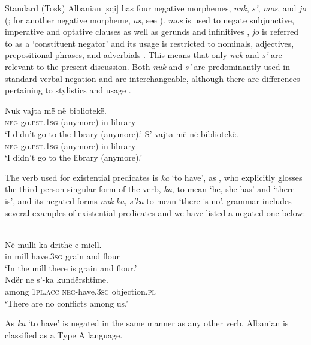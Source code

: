 ﻿\documentclass[output=paper]{langsci/langscibook}
\begin{document}
Standard (Tosk) Albanian [sqi] has four negative morphemes,
\textit{nuk}, \textit{s’}, \textit{mos}, and \textit{jo}
(\citealt[82]{Turano2000}; for another negative morpheme, \textit{as}, see
\citealt[172]{BuchholzFiedler1987}). \textit{mos} is used to negate
subjunctive, imperative and optative clauses as well as gerunds and
infinitives \citep[85]{Turano2000}, \textit{jo} is referred to as a
`constituent negator' and its usage is restricted to nominals, adjectives,
prepositional phrases, and adverbials \citep[86]{Turano2000}. This means
that only \textit{nuk} and \textit{s’} are relevant to the present
discussion. Both \textit{nuk} and \textit{s’} are predominantly used in
standard verbal negation and are interchangeable, although there are
differences pertaining to stylistics and usage \parencite[172]{BuchholzFiedler1987}. 
%
\begin{exe}\ex
{}
\begin{xlist}
\ex
    \gll Nuk vajta {\op}më{\cp} në bibliotekë.  \\
\textsc{neg}  go.\textsc{pst.1sg} (anymore) in  library \\
    \glt `I didn't go to the library (anymore).' 
\ex
\gll S’-vajta {\op}më{\cp} në bibliotekë.\\
\textsc{neg}-go.\textsc{pst}.\textsc{1sg}  (anymore) in library\\
\glt `I didn't go to the library (anymore).' 
\end{xlist}\end{exe}
%
The verb used for existential predicates is \textit{ka} `to have', as \citet[12]{Camaj1984}, who explicitly glosses the third person singular form of the verb, \textit{ka}, to mean `he, she has' and `there is', and its negated forms \textit{nuk} \textit{ka}, \textit{s’ka} to mean `there is no'.  grammar includes several examples of existential predicates and we have listed a negated one below:
%
\begin{exe}\ex
{}\\
    \gll Në  mulli ka drithë e miell. \\
in mill have.\textsc{3sg} grain and flour \\
    \glt
`In the mill there is grain and flour.' 
\ex
{}\\
    \gll Ndër ne s’-ka kundërshtime. \\
among \textsc{1pl}.\textsc{acc}  \textsc{neg}-have.\textsc{3sg} objection.\textsc{pl} \\
    \glt `There are no conflicts among us.' 
    \end{exe}
%
As \textit{ka} `to have' is negated in the same manner as any other verb,
Albanian is classified as a Type A language. 
\end{document}
